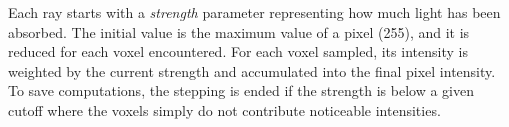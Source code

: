 Each ray starts with a \emph{strength} parameter representing how much light has been absorbed. The initial value is the maximum value of a pixel (255), and it is reduced for each voxel encountered. For each voxel sampled, its intensity is weighted by the current strength and accumulated into the final pixel intensity. To save computations, the stepping is ended if the strength is below a given cutoff where the voxels simply do not contribute noticeable intensities.